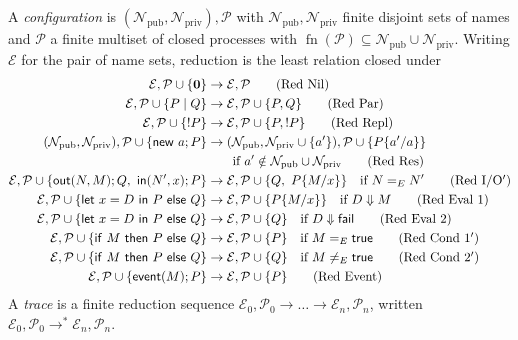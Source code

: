 \documentclass[11pt]{article}
\theoremstyle{definition}
\theoremstyle{plain}
\theoremstyle{remark}
\newcommand{\pv}[1]{\mathsf{#1}}
\newcommand{\fail}{\pv{fail}}
\newcommand{\true}{\pv{true}}
\newcommand{\ev}{\Downarrow}
\newcommand{\Npub}{\mathcal{N}_{\mathrm{pub}}}
\newcommand{\Npriv}{\mathcal{N}_{\mathrm{priv}}}
\newcommand{\fn}{\operatorname{fn}}
\begin{document}
A \emph{configuration} is $(\Npub,\Npriv),\mathcal{P}$ with $\Npub,\Npriv$ finite disjoint sets of names and $\mathcal{P}$ a finite multiset of closed processes with $\fn(\mathcal{P})\subseteq\Npub\cup\Npriv$. Writing $\mathcal{E}$ for the pair of name sets, reduction is the least relation closed under
\begin{align*}
\mathcal{E},\mathcal{P}\cup\{\mathbf{0}\}&\to\mathcal{E},\mathcal{P} \tag{Red Nil}\\
\mathcal{E},\mathcal{P}\cup\{P\mid Q\}&\to\mathcal{E},\mathcal{P}\cup\{P,Q\} \tag{Red Par}\\
\mathcal{E},\mathcal{P}\cup\{!P\}&\to\mathcal{E},\mathcal{P}\cup\{P,!P\} \tag{Red Repl}\\
(\Npub,\Npriv),\mathcal{P}\cup\{\pv{new}\ a;P\}&\to(\Npub,\Npriv\cup\{a'\}),\mathcal{P}\cup\{P\{a'/a\}\}\notag\\
&\qquad\text{if } a'\notin\Npub\cup\Npriv \tag{Red Res}\\
\mathcal{E},\mathcal{P}\cup\{\pv{out}(N,M);Q,\ \pv{in}(N',x);P\}&\to\mathcal{E},\mathcal{P}\cup\{Q,\ P\{M/x\}\}\quad\text{if } N=_E N' \tag{Red I/O$'$}\\
\mathcal{E},\mathcal{P}\cup\{\pv{let}\ x=D\ \pv{in}\ P\ \pv{else}\ Q\}&\to\mathcal{E},\mathcal{P}\cup\{P\{M/x\}\}\quad\text{if } D\ev M \tag{Red Eval 1}\\
\mathcal{E},\mathcal{P}\cup\{\pv{let}\ x=D\ \pv{in}\ P\ \pv{else}\ Q\}&\to\mathcal{E},\mathcal{P}\cup\{Q\}\quad\text{if } D\ev\fail \tag{Red Eval 2}\\
\mathcal{E},\mathcal{P}\cup\{\pv{if}\ M\ \pv{then}\ P\ \pv{else}\ Q\}&\to\mathcal{E},\mathcal{P}\cup\{P\}\quad\text{if } M=_E\true \tag{Red Cond 1$'$}\\
\mathcal{E},\mathcal{P}\cup\{\pv{if}\ M\ \pv{then}\ P\ \pv{else}\ Q\}&\to\mathcal{E},\mathcal{P}\cup\{Q\}\quad\text{if } M\ne_E\true \tag{Red Cond 2$'$}\\
\mathcal{E},\mathcal{P}\cup\{\pv{event}(M);P\}&\to\mathcal{E},\mathcal{P}\cup\{P\} \tag{Red Event}
\end{align*}
A \emph{trace} is a finite reduction sequence $\mathcal{E}_0,\mathcal{P}_0\to\dots\to\mathcal{E}_n,\mathcal{P}_n$, written $\mathcal{E}_0,\mathcal{P}_0\to^*\mathcal{E}_n,\mathcal{P}_n$.
\end{document}
